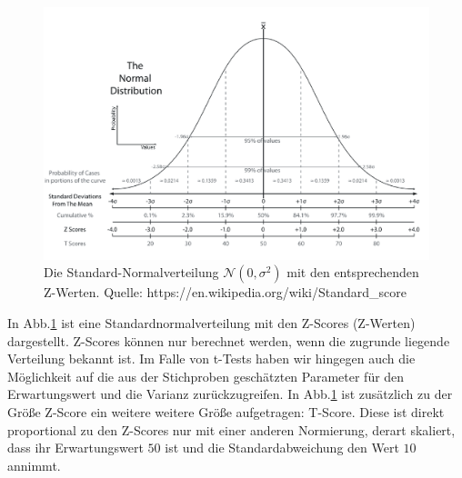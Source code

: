 \begin{figure}[!htp]
	\begin{center}
		\includegraphics[width=150mm]{06_vorlesung/media/StandardScore.png}
		\caption{Die Standard-Normalverteilung $\mathcal{N}(0,\sigma^2)$ mit den entsprechenden Z-Werten.\newline 
		Quelle: https://en.wikipedia.org/wiki/Standard\_score }
		\label{fig:StandardScore}
	\end{center}
\end{figure}
In Abb.\ref*{fig:StandardScore} ist eine Standardnormalverteilung mit den 
Z-Scores (Z-Werten) dargestellt. 
Z-Scores können nur berechnet werden, wenn die zugrunde liegende Verteilung bekannt ist.
Im Falle von t-Tests haben wir hingegen auch die Möglichkeit auf die aus der Stichproben
geschätzten Parameter für den Erwartungswert und die Varianz zurückzugreifen.
In Abb.\ref*{fig:StandardScore} ist zusätzlich zu der Größe Z-Score ein weitere weitere
Größe aufgetragen: T-Score. Diese ist direkt proportional zu den Z-Scores nur mit einer
anderen Normierung, derart skaliert, dass ihr Erwartungswert $50$ ist und die
Standardabweichung den Wert $10$ annimmt. 

